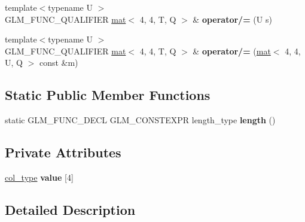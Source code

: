 \begin{DoxyCompactItemize}
\item 
\mbox{\label{structglm_1_1mat_3_014_00_014_00_01T_00_01Q_01_4_a21ed80672db29c6d29a43ec8e53ae869}} 
{\footnotesize template$<$typename U $>$ }\\G\+L\+M\+\_\+\+F\+U\+N\+C\+\_\+\+Q\+U\+A\+L\+I\+F\+I\+ER \hyperlink{structglm_1_1mat}{mat}$<$ 4, 4, T, Q $>$ \& {\bfseries operator/=} (U s)
\item 
\mbox{\label{structglm_1_1mat_3_014_00_014_00_01T_00_01Q_01_4_a7d40629b14a68cedd7aca94bcb81c5d9}} 
{\footnotesize template$<$typename U $>$ }\\G\+L\+M\+\_\+\+F\+U\+N\+C\+\_\+\+Q\+U\+A\+L\+I\+F\+I\+ER \hyperlink{structglm_1_1mat}{mat}$<$ 4, 4, T, Q $>$ \& {\bfseries operator/=} (\hyperlink{structglm_1_1mat}{mat}$<$ 4, 4, U, Q $>$ const \&m)
\end{DoxyCompactItemize}
\subsection*{Static Public Member Functions}
\begin{DoxyCompactItemize}
\item 
\mbox{\label{structglm_1_1mat_3_014_00_014_00_01T_00_01Q_01_4_a345a0bcf281399c047cb15a6551232b0}} 
static G\+L\+M\+\_\+\+F\+U\+N\+C\+\_\+\+D\+E\+CL G\+L\+M\+\_\+\+C\+O\+N\+S\+T\+E\+X\+PR length\+\_\+type {\bfseries length} ()
\end{DoxyCompactItemize}
\subsection*{Private Attributes}
\begin{DoxyCompactItemize}
\item 
\mbox{\label{structglm_1_1mat_3_014_00_014_00_01T_00_01Q_01_4_a43dd26acc0a0d26257b38393edc53328}} 
\hyperlink{structglm_1_1vec_3_014_00_01T_00_01Q_01_4}{col\+\_\+type} {\bfseries value} \mbox{[}4\mbox{]}
\end{DoxyCompactItemize}


\subsection{Detailed Description}
